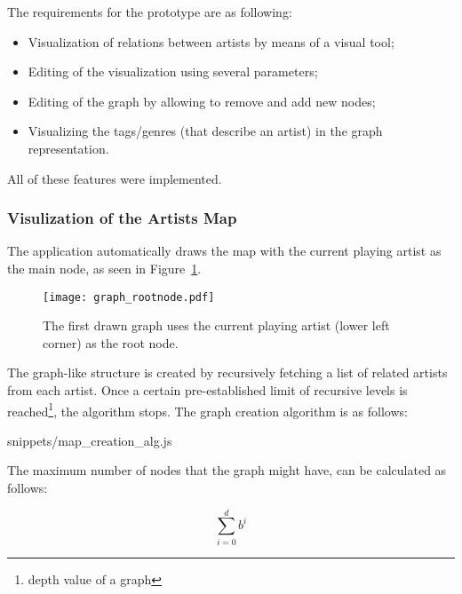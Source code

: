     The requirements for the prototype are as following:

    \begin{itemize}
      \item Visualization of relations between artists by means of a visual tool;
      \item Editing of the visualization using several parameters;
      \item Editing of the graph by allowing to remove and add new nodes;
      \item Visualizing the tags/genres (that describe an artist) in the graph representation.
    \end{itemize}

    All of these features were implemented.

    \subsubsection{Visulization of the Artists Map} %
      \label{ssub:visualization}
    
      The application automatically draws the map with the current playing artist as the main node, as seen in Figure~\ref{fig:graph_rootnode}.

      \begin{figure}[H]
        \begin{center}
          \texttt{[image: graph\_rootnode.pdf]}
        \end{center}
        \caption{The first drawn graph uses the current playing artist (lower left corner) as the root node.}
        \label{fig:graph_rootnode}
      \end{figure}

      The graph-like structure is created by recursively fetching a list of related artists from each artist. Once a certain pre-established limit of recursive levels is reached\footnote{depth value of a graph}, the algorithm stops.
      The graph creation algorithm is as follows:

      
      {snippets/map_creation_alg.js}

      The maximum number of nodes that the graph might have, can be calculated as follows:

      \begin{equation}
          \sum_{i=0}^{d} b ^ i
      \end{equation}

